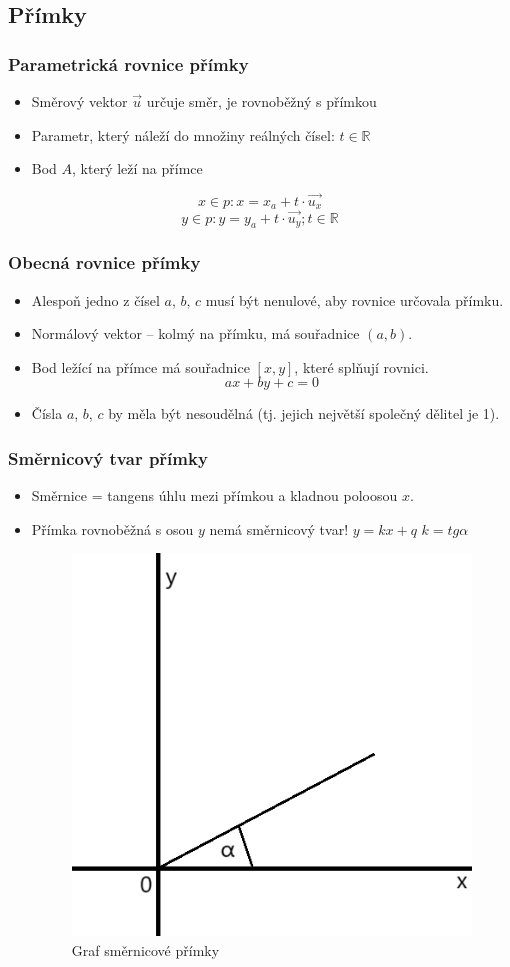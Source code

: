 \subsection{Přímky}

\subsubsection{Parametrická rovnice přímky}

\begin{itemize}
    \item Směrový vektor $\overrightarrow{u}$ určuje směr, je rovnoběžný s přímkou
    \item Parametr, který náleží do množiny reálných čísel: $ t \in \mathbb{R} $
    \item Bod $ A $, který leží na přímce
\end{itemize}
$$
    x\in p:x=x_a+t \cdot \overrightarrow{u_x}
$$
$$
    y\in p:y=y_a+t \cdot \overrightarrow{u_y}; t \in \mathbb{R}
$$

\subsubsection{Obecná rovnice přímky}

\begin{itemize}
    \item Alespoň jedno z čísel $a$, $b$, $c$ musí být nenulové, aby rovnice určovala přímku.
    \item Normálový vektor – kolmý na přímku, má souřadnice $(a, b)$.
    \item Bod ležící na přímce má souřadnice $[x, y]$, které splňují rovnici.
$$
    ax+by+c=0
$$
    \item Čísla $a$, $b$, $c$ by měla být nesoudělná (tj. jejich největší společný dělitel je 1).
\end{itemize}

\subsubsection{Směrnicový tvar přímky}
\begin{itemize}
    \item Směrnice = tangens úhlu mezi přímkou a kladnou poloosou $x$.
    \item Přímka rovnoběžná s osou $y$ nemá směrnicový tvar!
    $y=kx+q$
    $k=tg\alpha$
\begin{figure}[H]
        \centering
        \includegraphics[width=0.2\linewidth]{img/20_kartezka_alfa.png}
        \caption{Graf směrnicové přímky} 
        \label{fig:enter-label}
    \end{figure}
\end{itemize}

